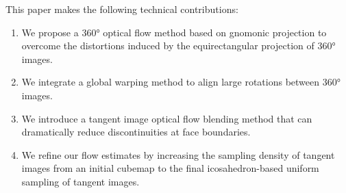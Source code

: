 This paper makes the following technical contributions:
\begin{enumerate}[nosep]
\item 
We propose a 360° optical flow method based on gnomonic projection to overcome the distortions induced by the equirectangular projection of 360° images.

\item
We integrate a global warping method to align large rotations between 360° images.

\item
We introduce a tangent image optical flow blending method that can dramatically reduce discontinuities at face boundaries.

\item 
We refine our flow estimates by increasing the sampling density of tangent images from an initial cubemap to the final icosahedron-based uniform sampling of tangent images.
\end{enumerate}
